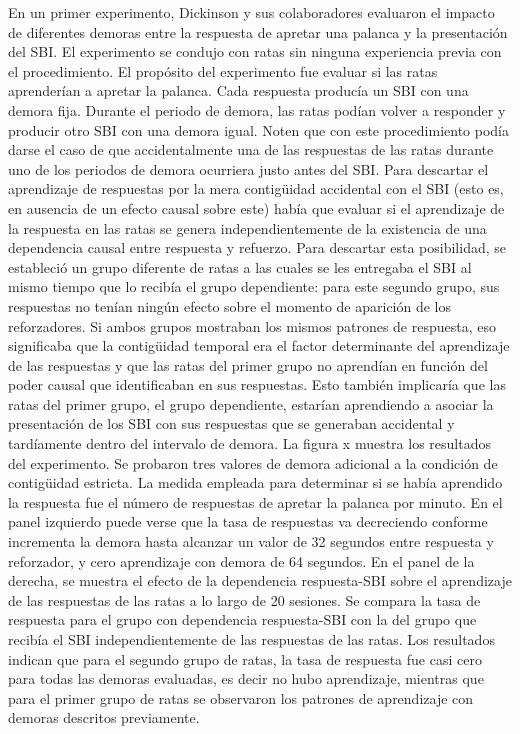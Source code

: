 \documentclass[
  a4paper,
  DIV=11,
  numbers=noendperiod]{scrreprt}
\begin{document}
En un primer experimento, Dickinson y sus colaboradores evaluaron el
impacto de diferentes demoras entre la respuesta de apretar una palanca
y la presentación del SBI. El experimento se condujo con ratas sin
ninguna experiencia previa con el procedimiento. El propósito del
experimento fue evaluar si las ratas aprenderían a apretar la palanca.
Cada respuesta producía un SBI con una demora fija. Durante el periodo
de demora, las ratas podían volver a responder y producir otro SBI con
una demora igual. Noten que con este procedimiento podía darse el caso
de que accidentalmente una de las respuestas de las ratas durante uno de
los periodos de demora ocurriera justo antes del SBI. Para descartar el
aprendizaje de respuestas por la mera contigüidad accidental con el SBI
(esto es, en ausencia de un efecto causal sobre este) había que evaluar
si el aprendizaje de la respuesta en las ratas se genera
independientemente de la existencia de una dependencia causal entre
respuesta y refuerzo. Para descartar esta posibilidad, se estableció un
grupo diferente de ratas a las cuales se les entregaba el SBI al mismo
tiempo que lo recibía el grupo dependiente: para este segundo grupo, sus
respuestas no tenían ningún efecto sobre el momento de aparición de los
reforzadores. Si ambos grupos mostraban los mismos patrones de
respuesta, eso significaba que la contigüidad temporal era el factor
determinante del aprendizaje de las respuestas y que las ratas del
primer grupo no aprendían en función del poder causal que identificaban
en sus respuestas. Esto también implicaría que las ratas del primer
grupo, el grupo dependiente, estarían aprendiendo a asociar la
presentación de los SBI con sus respuestas que se generaban accidental y
tardíamente dentro del intervalo de demora. La figura x muestra los
resultados del experimento. Se probaron tres valores de demora adicional
a la condición de contigüidad estricta. La medida empleada para
determinar si se había aprendido la respuesta fue el número de
respuestas de apretar la palanca por minuto. En el panel izquierdo puede
verse que la tasa de respuestas va decreciendo conforme incrementa la
demora hasta alcanzar un valor de 32 segundos entre respuesta y
reforzador, y cero aprendizaje con demora de 64 segundos. En el panel de
la derecha, se muestra el efecto de la dependencia respuesta-SBI sobre
el aprendizaje de las respuestas de las ratas a lo largo de 20 sesiones.
Se compara la tasa de respuesta para el grupo con dependencia
respuesta-SBI con la del grupo que recibía el SBI independientemente de
las respuestas de las ratas. Los resultados indican que para el segundo
grupo de ratas, la tasa de respuesta fue casi cero para todas las
demoras evaluadas, es decir no hubo aprendizaje, mientras que para el
primer grupo de ratas se observaron los patrones de aprendizaje con
demoras descritos previamente.
\end{document}
